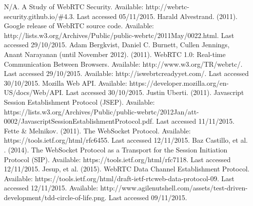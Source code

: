 \documentclass[]{report}
\begin{document}
\begin{thebibliography}{20}
		N/A. A Study of WebRTC Security. Available: http://webrtc-security.github.io/\#4.3. Last accessed 05/11/2015.
		Harald Alvestrand. (2011). Google release of WebRTC source code. Available: http://lists.w3.org/Archives/Public/public-webrtc/2011May/0022.html. Last accessed 29/10/2015.
		Adam Bergkvist, Daniel C. Burnett, Cullen Jennings, Anant Narayanan (until November 2012). (2011). WebRTC 1.0: Real-time Communication Between Browsers. Available: http://www.w3.org/TR/webrtc/. Last accessed 29/10/2015.
		Available: http://iswebrtcreadyyet.com/. Last accessed 30/10/2015.
		Mozilla Web API. Available: https://developer.mozilla.org/en-US/docs/Web/API. Last accessed 30/10/2015.
		Justin Uberti. (2011). Javascript Session Establishment Protocol (JSEP). Available: https://lists.w3.org/Archives/Public/public-webrtc/2012Jan/att-0002/JavascriptSessionEstablishmentProtocol.pdf. Last accessed 11/11/2015.
		Fette \& Melnikov. (2011). The WebSocket Protocol. Available: https://tools.ietf.org/html/rfc6455. Last accessed 12/11/2015.
		Baz Castillo, et al. . (2014). The WebSocket Protocol as a Transport for the Session Initiation Protocol (SIP). Available: https://tools.ietf.org/html/rfc7118. Last accessed 12/11/2015.
		Jesup, et al. (2015). WebRTC Data Channel Establishment Protocol. Available: https://tools.ietf.org/html/draft-ietf-rtcweb-data-protocol-09. Last accessed 12/11/2015.
		Available: http://www.agilenutshell.com/assets/test-driven-development/tdd-circle-of-life.png. Last accessed 09/11/2015.
	\end{thebibliography}
\end{document}
